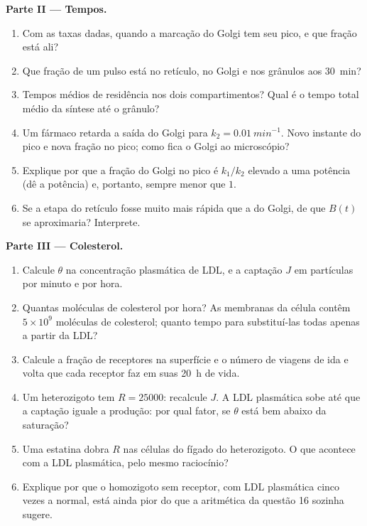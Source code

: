 \begin{problem}
\medskip
\noindent\textbf{Parte II --- Tempos.}
\begin{enumerate}[resume]
  \item Com as taxas dadas, quando a marcação do Golgi tem seu pico, e
        que fração está ali?
  \item Que fração de um pulso está no retículo, no Golgi e nos
        grânulos aos \qty{30}{min}?
  \item Tempos médios de residência nos dois compartimentos? Qual é o
        tempo total médio da síntese até o grânulo?
  \item Um fármaco retarda a saída do Golgi para
        $k_{2} = \qty{0.01}{min^{-1}}$. Novo instante do pico e nova
        fração no pico; como fica o Golgi ao microscópio?
  \item Explique por que a fração do Golgi no pico é $k_{1}/k_{2}$
        elevado a uma potência (dê a potência) e, portanto, sempre
        menor que $1$.
  \item Se a etapa do retículo fosse muito mais rápida que a do Golgi,
        de que $B(t)$ se aproximaria? Interprete.
\end{enumerate}

\medskip
\noindent\textbf{Parte III --- Colesterol.}
\begin{enumerate}[resume]
  \item Calcule $\theta$ na concentração plasmática de LDL, e a
        captação $J$ em partículas por minuto e por hora.
  \item Quantas moléculas de colesterol por hora? As membranas da
        célula contêm $5\times 10^{9}$ moléculas de colesterol; quanto
        tempo para substituí-las todas apenas a partir da LDL?
  \item Calcule a fração de receptores na superfície e o número de
        viagens de ida e volta que cada receptor faz em suas
        \qty{20}{h} de vida.
  \item Um heterozigoto tem $R = \num{25000}$: recalcule $J$. A LDL
        plasmática sobe até que a captação iguale a produção: por qual
        fator, se $\theta$ está bem abaixo da saturação?
  \item Uma estatina dobra $R$ nas células do fígado do heterozigoto. O
        que acontece com a LDL plasmática, pelo mesmo raciocínio?
  \item Explique por que o homozigoto sem receptor, com LDL plasmática
        cinco vezes a normal, está ainda pior do que a aritmética da
        questão 16 sozinha sugere.
\end{enumerate}


\end{problem}
